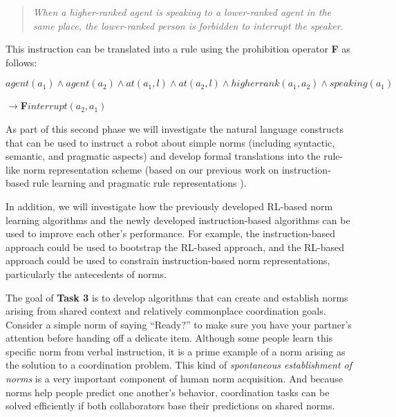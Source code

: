 \documentclass[12pt]{article}
\begin{document}
\begin{quote}
 {\em When a higher-ranked agent is speaking to a lower-ranked agent
   in the same place, the lower-ranked person is forbidden to
   interrupt the speaker.}
\end{quote}
\vspace{-1mm}
\noindent This instruction can be translated into a rule using the prohibition
operator {\bf F} as follows:

\vskip 0.1in
\noindent $agent(a_1) \land agent(a_2) \land at(a_1,l) \land at(a_2,l) \land
higherrank(a_1,a_2) \land speaking(a_1)$

$ \rightarrow${\bf F}$interrupt(a_2,a_1)$
\vskip 0.1in


\vskip 0.05in
\noindent As part of this second phase we will investigate the natural
language constructs that can be used to instruct a robot about simple
norms (including syntactic, semantic, and pragmatic aspects) and
develop formal translations into the rule-like norm representation
scheme (based on our previous work on instruction-based rule learning
\citep{cantrelletal12hri} and pragmatic rule representations
\citep{williamsetal15aaai}).

In addition, we will investigate how the previously developed RL-based
norm learning algorithms and the newly developed instruction-based
algorithms can be used to improve each other's performance. For
example, the instruction-based approach could be used to bootstrap the
RL-based approach, and the RL-based approach could be used to
constrain instruction-based norm representations, particularly the
antecedents of norms.


\vskip 0.1in
\vskip 0.1in
\label{sec:task3}

\vspace{2mm}

\noindent The goal of {\bf Task 3} is to develop algorithms that can create and
establish norms arising from shared context and relatively commonplace
coordination goals. Consider a simple norm of saying ``Ready?'' to
make sure you have your partner's attention before handing off a
delicate item.  Although some people learn this specific norm from
verbal instruction, it is a prime example of a norm arising as the
solution to a coordination problem. This kind of {\em spontaneous
  establishment of norms} is a very important component of human norm
acquisition.  And because norms help people predict one another's
behavior, coordination tasks can be solved efficiently if both
collaborators base their predictions on shared norms.
 
\end{document}
